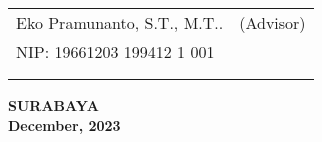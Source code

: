     \noindent
    \begin{tabularx}{\textwidth}{X c}
      Eko Pramunanto, S.T., M.T..          & (Advisor) \\
      NIP: 19661203 199412 1 001        & \\
      &  \\
      &  \\
    \end{tabularx}
  \endgroup

  \vspace{\fill}

  \begin{center}
    \textbf{SURABAYA} \\
    \textbf{December, 2023}
  \end{center}
\endgroup
